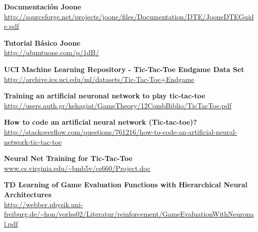\documentclass[12pt,titlepage]{article}
\begin{document}
\newpage
\begin{thebibliography}{99}
		\textbf{Documentaci\'on Joone} \\
		\url{http://sourceforge.net/projects/joone/files/Documentation/DTE/JooneDTEGuide.pdf}

		\textbf{Tutorial B\'asico Joone} \\
		\url{http://ubuntuone.com/p/1dB/}

		\textbf{UCI Machine Learning Repository - Tic-Tac-Toe Endgame Data Set} \\
		\url{http://archive.ics.uci.edu/ml/datasets/Tic-Tac-Toe+Endgame}

		\textbf{Training an artificial neuronal network to play tic-tac-toe} \\
		\url{http://users.auth.gr/kehagiat/GameTheory/12CombBiblio/TicTacToe.pdf}

		\textbf{How to code an artificial neural network (Tic-tac-toe)?} \\
		{\url{http://stackoverflow.com/questions/761216/how-to-code-an-artificial-neural-network-tic-tac-toe}}

		\textbf{Neural Net Training for Tic-Tac-Toe} \\
		\url{www.cs.virginia.edu/~bmb5v/cs660/Project.doc}

		\textbf{TD Learning of Game Evaluation Functions with Hierarchical Neural Architectures} \\
		\url{http://webber.physik.uni-freiburg.de/~hon/vorlss02/Literatur/reinforcement/GameEvaluationWithNeuronal.pdf}

\end{thebibliography}


\end{document}
